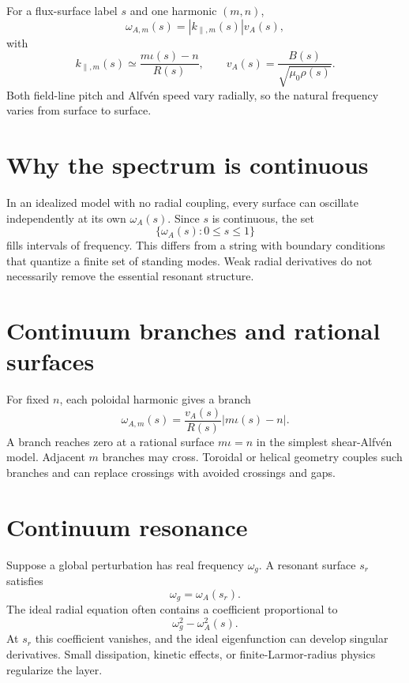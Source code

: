 \documentclass[11pt]{article}
\begin{document}
For a flux-surface label $s$ and one harmonic $(m,n)$,
\begin{equation}
\omega_{A,m}(s)=|k_{\parallel,m}(s)|v_A(s),
\end{equation}
with
\begin{equation}
k_{\parallel,m}(s)\simeq\frac{m\iota(s)-n}{R(s)},\qquad
v_A(s)=\frac{B(s)}{\sqrt{\mu_0\rho(s)}}.
\end{equation}
Both field-line pitch and Alfvén speed vary radially, so the natural frequency varies from surface to surface.


\section{Why the spectrum is continuous}

In an idealized model with no radial coupling, every surface can oscillate independently at its own $\omega_A(s)$. Since $s$ is continuous, the set
\begin{equation}
\{\omega_A(s):0\le s\le1\}
\end{equation}
fills intervals of frequency. This differs from a string with boundary conditions that quantize a finite set of standing modes. Weak radial derivatives do not necessarily remove the essential resonant structure.


\section{Continuum branches and rational surfaces}

For fixed $n$, each poloidal harmonic gives a branch
\begin{equation}
\omega_{A,m}(s)=\frac{v_A(s)}{R(s)}
|m\iota(s)-n|.
\end{equation}
A branch reaches zero at a rational surface $m\iota=n$ in the simplest shear-Alfvén model. Adjacent $m$ branches may cross. Toroidal or helical geometry couples such branches and can replace crossings with avoided crossings and gaps.


\section{Continuum resonance}

Suppose a global perturbation has real frequency $\omega_g$. A resonant surface $s_r$ satisfies
\begin{equation}
\omega_g=\omega_A(s_r).
\end{equation}
The ideal radial equation often contains a coefficient proportional to
\begin{equation}
\omega_g^2-\omega_A^2(s).
\end{equation}
At $s_r$ this coefficient vanishes, and the ideal eigenfunction can develop singular derivatives. Small dissipation, kinetic effects, or finite-Larmor-radius physics regularize the layer.
\end{document}

